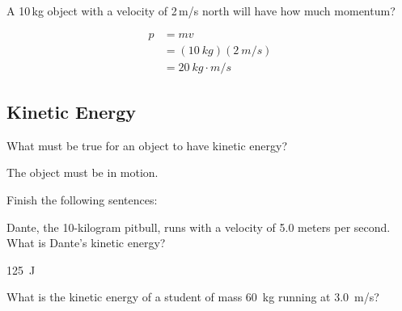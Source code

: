 \documentclass[answers]{exam}
\begin{document}
\begin{questions}
\question 
A 10\,kg object with a velocity of 2\,m/s north will have how much momentum?

\begin{solution}
    \begin{align*}
        p &= mv\\[1ex]
          &= (\SI{10}{kg})(\SI{2}{m/s})\\[1ex]
          &= \boxed{\SI{20}{kg\cdot m/s}}
    \end{align*}
\end{solution}

\clearpage
\begin{EnvUplevel}
    \subsection{Kinetic Energy}
\end{EnvUplevel}

\question
What must be true for an object to have kinetic energy?

\begin{solution}
    The object must be in motion.
\end{solution}

\question 
Finish the following sentences:


\question \label{taHSMX}
Dante, the 10-kilogram pitbull, runs with a velocity of 5.0 meters per second. What is Dante's kinetic energy?

\begin{solution}
\SI{125}{J}
\end{solution}

\question \label{QRI2H9}
What is the kinetic energy of a student of mass \SI{60}{kg} running at \SI{3.0}{m/s}?


\end{questions}
\end{document}
